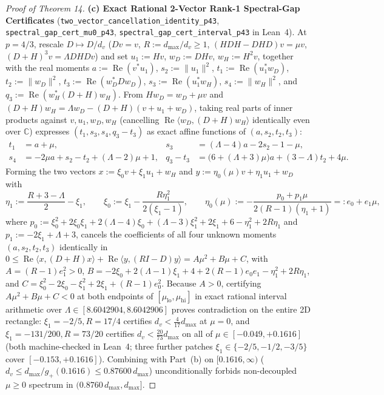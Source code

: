 \documentclass[10pt,letterpaper]{article}
\newcommand{\C}{\mathbb{C}}
\begin{document}
\begin{proof}[Proof of Theorem 14]
\textbf{(c) Exact Rational 2-Vector Rank-1 Spectral-Gap Certificates} (\texttt{two\_vector\_cancellation\_identity\_p43}, \texttt{spectral\_gap\_cert\_mu0\_p43}, \texttt{spectral\_gap\_cert\_interval\_p43} in Lean~4).
At $p = 4/3$, rescale $D \mapsto D/d_v$ ($Dv = v$, $R := d_{\max}/d_v \ge 1$, $(H D H - D H D)v = \mu v$, $(D+H)^3 v = \Lambda D H D v$) and set $u_1 := Hv$, $w_D := DHv$, $w_H := H^2 v$, together with the real moments $a := \operatorname{Re}(v^* u_1)$, $s_2 := \|u_1\|^2$, $t_1 := \operatorname{Re}(u_1^* w_D)$, $t_2 := \|w_D\|^2$, $t_3 := \operatorname{Re}(w_D^* D w_D)$, $s_3 := \operatorname{Re}(u_1^* w_H)$, $s_4 := \|w_H\|^2$, and $q_3 := \operatorname{Re}(w_H^*(D+H)w_H)$. From $H w_D = w_D + \mu v$ and $(D+H)w_H = \Lambda w_D - (D+H)(v + u_1 + w_D)$, taking real parts of inner products against $v, u_1, w_D, w_H$ (cancelling $\operatorname{Re}\langle w_D, (D+H)w_H\rangle$ identically even over $\C$) expresses $(t_1, s_3, s_4, q_3 - t_3)$ as exact affine functions of $(a, s_2, t_2, t_3)$:
\begin{align*}
  t_1 &= a + \mu, &
  s_3 &= (\Lambda - 4)a - 2s_2 - 1 - \mu, \\
  s_4 &= -2\mu a + s_2 - t_2 + (\Lambda - 2)\mu + 1, &
  q_3 - t_3 &= \bigl(6 + (\Lambda + 3)\mu\bigr)a + (3 - \Lambda)t_2 + 4\mu.
\end{align*}
Forming the two vectors $x := \xi_0 v + \xi_1 u_1 + w_H$ and $y := \eta_0(\mu) v + \eta_1 u_1 + w_D$ with
\[
  \eta_1 := \frac{R + 3 - \Lambda}{2} - \xi_1, \qquad
  \xi_0 := \xi_1 - \frac{R\eta_1^2}{2(\xi_1 - 1)}, \qquad
  \eta_0(\mu) := -\frac{p_0 + p_1 \mu}{2(R - 1)(\eta_1 + 1)} =: e_0 + e_1\mu,
\]
where $p_0 := \xi_0^2 + 2\xi_0\xi_1 + 2(\Lambda-4)\xi_0 + (\Lambda-3)\xi_1^2 + 2\xi_1 + 6 - \eta_1^2 + 2R\eta_1$ and $p_1 := -2\xi_1 + \Lambda + 3$, cancels the coefficients of all four unknown moments $(a, s_2, t_2, t_3)$ identically in $0 \le \operatorname{Re}\langle x, (D+H)x\rangle + \operatorname{Re}\langle y, (RI-D)y\rangle = A\mu^2 + B\mu + C$, with $A = (R - 1)e_1^2 > 0$, $B = -2\xi_0 + 2(\Lambda-1)\xi_1 + 4 + 2(R-1)e_0 e_1 - \eta_1^2 + 2R\eta_1$, and $C = \xi_0^2 - 2\xi_0 - \xi_1^2 + 2\xi_1 + (R-1)e_0^2$. Because $A > 0$, certifying $A\mu^2 + B\mu + C < 0$ at both endpoints of $[\mu_{\mathrm{lo}}, \mu_{\mathrm{hi}}]$ in exact rational interval arithmetic over $\Lambda \in [8.6042904, 8.6042906]$ proves contradiction on the entire 2D rectangle: $\xi_1 = -2/5, R = 17/4$ certifies $d_v < \frac{4}{17} d_{\max}$ at $\mu = 0$, and $\xi_1 = -131/200, R = 73/20$ certifies $d_v < \frac{20}{73} d_{\max}$ on all of $\mu \in [-0.049, +0.1616]$ (both machine-checked in Lean~4; three further patches $\xi_1 \in \{-2/5, -1/2, -3/5\}$ cover $[-0.153, +0.1616]$). Combining with Part~(b) on $[0.1616, \infty)$ ($d_v \le d_{\max}/g_+(0.1616) \le 0.87600\,d_{\max}$) unconditionally forbids non-decoupled $\mu \ge 0$ spectrum in $(0.8760\,d_{\max}, d_{\max}]$.


\end{proof}
\end{document}
